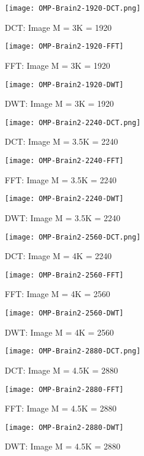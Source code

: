 \documentclass[titlepage,oneside, 12pt]{book}
\theoremstyle{break}
\begin{document}
\begin{figure}[!h]
\centering
{}
  \texttt{[image: OMP-Brain2-1920-DCT.png]}
  \caption{DCT: Image M = 3K = 1920}\label{fig:OMP-Brain2-1920-DCT}
\endminipage
\hspace*{2em}
  \texttt{[image: OMP-Brain2-1920-FFT]}
  \caption{FFT: Image M = 3K = 1920}\label{fig:OMP-Brain2-1920-FFT}
\endminipage
\hspace*{2em}
%
  \texttt{[image: OMP-Brain2-1920-DWT]}
  \caption{DWT: Image M = 3K = 1920}\label{fig:OMP-Brain2-1920-DWT}
\endminipage
\hspace*{2em}
\end{figure}

\clearpage

\begin{figure}[!h]
\centering
{}
  \texttt{[image: OMP-Brain2-2240-DCT.png]}
  \caption{DCT: Image M = 3.5K = 2240}\label{fig:OMP-Brain2-2240-DCT}
\endminipage
\hspace*{2em}
  \texttt{[image: OMP-Brain2-2240-FFT]}
  \caption{FFT: Image M = 3.5K = 2240}\label{fig:OMP-Brain2-2240-FFT}
\endminipage
\hspace*{2em}
%
  \texttt{[image: OMP-Brain2-2240-DWT]}
  \caption{DWT: Image M = 3.5K = 2240}\label{fig:OMP-Brain2-2240-DWT}
\endminipage
\hspace*{2em}
\end{figure}

\begin{figure}[!h]
\centering
{}
  \texttt{[image: OMP-Brain2-2560-DCT.png]}
  \caption{DCT: Image M = 4K = 2240}\label{fig:OMP-Brain2-2560-DCT}
\endminipage
\hspace*{2em}
  \texttt{[image: OMP-Brain2-2560-FFT]}
  \caption{FFT: Image M = 4K = 2560}\label{fig:OMP-Brain2-2560-FFT}
\endminipage
\hspace*{2em}
%
  \texttt{[image: OMP-Brain2-2560-DWT]}
  \caption{DWT: Image M = 4K = 2560}\label{fig:OMP-Brain2-2560-DWT}
\endminipage
\hspace*{2em}
\end{figure}

\begin{figure}[!h]
\centering
{}
  \texttt{[image: OMP-Brain2-2880-DCT.png]}
  \caption{DCT: Image M = 4.5K = 2880}\label{fig:OMP-Brain2-2880-DCT}
\endminipage
\hspace*{2em}
  \texttt{[image: OMP-Brain2-2880-FFT]}
  \caption{FFT: Image M = 4.5K = 2880}\label{fig:OMP-Brain2-2880-FFT}
\endminipage
\hspace*{2em}
%
  \texttt{[image: OMP-Brain2-2880-DWT]}
  \caption{DWT: Image M = 4.5K = 2880}\label{fig:OMP-Brain2-2880-DWT}
\endminipage
\hspace*{2em}
\end{figure}
\clearpage
\end{document}

